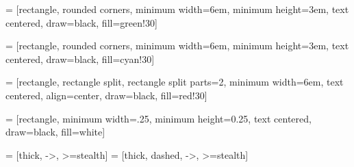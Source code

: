  = [rectangle, 
                            rounded corners, 
                            minimum width=6em, 
                            minimum height=3em, 
                            text centered, 
                            draw=black, 
                            fill=green!30]

     = [rectangle, 
                            rounded corners, 
                            minimum width=6em, 
                            minimum height=3em, 
                            text centered, 
                            draw=black, 
                            fill=cyan!30]

       = [rectangle,
                            rectangle split, 
                            rectangle split parts=2,
                            minimum width=6em, 
                            text centered,
                            align=center,
                            draw=black, 
                            fill=red!30]

      = [rectangle,
                            minimum width=.25, 
                            minimum height=0.25, 
                            text centered,
                            draw=black, 
                            fill=white]

        = [thick, ->, >=stealth]
  = [thick, dashed, ->, >=stealth]
